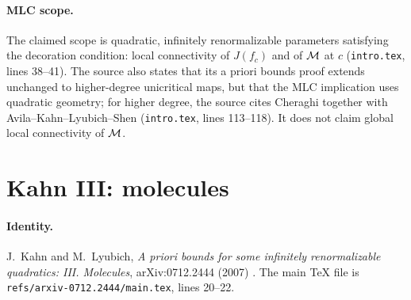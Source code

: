 \paragraph{MLC scope.}
The claimed scope is quadratic, infinitely renormalizable parameters satisfying the decoration
condition: local connectivity of $J(f_c)$ and of $\mathcal M$ at $c$ (\texttt{intro.tex}, lines 38--41).
The source also states that its a priori bounds proof extends unchanged to higher-degree
unicritical maps, but that the MLC implication uses quadratic geometry; for higher degree, the
source cites Cheraghi together with Avila--Kahn--Lyubich--Shen (\texttt{intro.tex}, lines
113--118).  It does not claim global local connectivity of $\mathcal M$.

\section{Kahn III: molecules}
\label{sec:kahn-III}

\paragraph{Identity.}
J.~Kahn and M.~Lyubich, \emph{A priori bounds for some infinitely renormalizable quadratics:
III. Molecules}, arXiv:0712.2444 (2007) \cite{KahnLyubichMolecules}.  The main TeX file is \texttt{refs/arxiv-0712.2444/main.tex},
lines 20--22.

